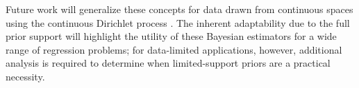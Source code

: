 \documentclass{article}
\begin{document}
	Future work will generalize these concepts for data drawn from continuous spaces using the continuous Dirichlet process \cite{gershman}. The inherent adaptability due to the full prior support will highlight the utility of these Bayesian estimators for a wide range of regression problems; for data-limited applications, however, additional analysis is required to determine when limited-support priors are a practical necessity.
	
	
	
	
	
	
	
	
\end{document}
